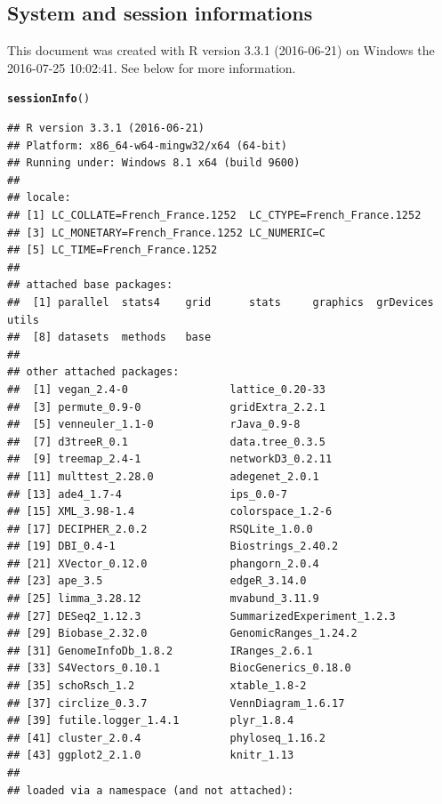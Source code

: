 \documentclass[12pt]{article}\usepackage[]{graphicx}\usepackage[]{color}
\makeatletter
\newcommand{\hlstd}[1]{\textcolor[rgb]{0.345,0.345,0.345}{#1}}%
\newcommand{\hlkwd}[1]{\textcolor[rgb]{0.737,0.353,0.396}{\textbf{#1}}}%
\newenvironment{kframe}{%
 \def\at@end@of@kframe{}%
 \ifinner\ifhmode%
  \def\at@end@of@kframe{\end{minipage}}%
  \begin{minipage}{\columnwidth}%
 \fi\fi%
 \def\FrameCommand##1{\hskip\@totalleftmargin \hskip-\fboxsep
 \colorbox{shadecolor}{##1}\hskip-\fboxsep
     \hskip-\linewidth \hskip-\@totalleftmargin \hskip\columnwidth}%
 \MakeFramed {\advance\hsize-\width
   \@totalleftmargin\z@ \linewidth\hsize
   \@setminipage}}%
 {\par\unskip\endMakeFramed%
 \at@end@of@kframe}
\newenvironment{knitrout}{}{} %
\numberwithin{figure}{section}
\makeatother
\begin{document}
  \subsection{System and session informations}
  This document was created with R version 3.3.1 (2016-06-21) on Windows the 2016-07-25 10:02:41. See below for more information. 
\begin{knitrout}\small
{}\color{fgcolor}\begin{kframe}
\begin{alltt}
\hlkwd{sessionInfo}\hlstd{()}
\end{alltt}
\begin{verbatim}
## R version 3.3.1 (2016-06-21)
## Platform: x86_64-w64-mingw32/x64 (64-bit)
## Running under: Windows 8.1 x64 (build 9600)
## 
## locale:
## [1] LC_COLLATE=French_France.1252  LC_CTYPE=French_France.1252   
## [3] LC_MONETARY=French_France.1252 LC_NUMERIC=C                  
## [5] LC_TIME=French_France.1252    
## 
## attached base packages:
##  [1] parallel  stats4    grid      stats     graphics  grDevices utils    
##  [8] datasets  methods   base     
## 
## other attached packages:
##  [1] vegan_2.4-0                lattice_0.20-33           
##  [3] permute_0.9-0              gridExtra_2.2.1           
##  [5] venneuler_1.1-0            rJava_0.9-8               
##  [7] d3treeR_0.1                data.tree_0.3.5           
##  [9] treemap_2.4-1              networkD3_0.2.11          
## [11] multtest_2.28.0            adegenet_2.0.1            
## [13] ade4_1.7-4                 ips_0.0-7                 
## [15] XML_3.98-1.4               colorspace_1.2-6          
## [17] DECIPHER_2.0.2             RSQLite_1.0.0             
## [19] DBI_0.4-1                  Biostrings_2.40.2         
## [21] XVector_0.12.0             phangorn_2.0.4            
## [23] ape_3.5                    edgeR_3.14.0              
## [25] limma_3.28.12              mvabund_3.11.9            
## [27] DESeq2_1.12.3              SummarizedExperiment_1.2.3
## [29] Biobase_2.32.0             GenomicRanges_1.24.2      
## [31] GenomeInfoDb_1.8.2         IRanges_2.6.1             
## [33] S4Vectors_0.10.1           BiocGenerics_0.18.0       
## [35] schoRsch_1.2               xtable_1.8-2              
## [37] circlize_0.3.7             VennDiagram_1.6.17        
## [39] futile.logger_1.4.1        plyr_1.8.4                
## [41] cluster_2.0.4              phyloseq_1.16.2           
## [43] ggplot2_2.1.0              knitr_1.13                
## 
## loaded via a namespace (and not attached):

\end{verbatim}
\end{kframe}
\end{knitrout}
\end{document}
